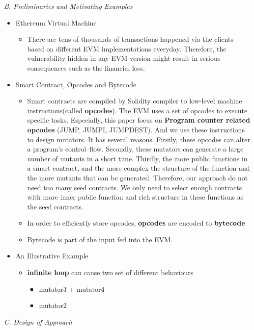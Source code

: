 \documentclass[a4paper]{article}
\begin{document}
	\textit{B. Preliminaries and Motivating Examples}
	\begin{itemize}
		\item Ethereum Virtual Machine
		\begin{itemize}
			\item  There are tens
			of thousands of transactions happened via the clients based on
			different EVM implementations everyday. Therefore, the vulnerability
			hidden in any EVM version might result in serious consequences such as the financial loss.
		\end{itemize}
		\item Smart Contract, Opcodes and Bytecode
		\begin{itemize}
			\item Smart contracts are compiled by Solidity compiler to low-level machine instructions(called \textbf{opcodes}). The EVM uses a set of opcodes to execute specific tasks. Especially, this paper focus on \textbf{Program counter related opcodes} (JUMP, JUMPI, JUMPDEST). And we use these instructions to design mutators. It has several reasons. Firstly, these opcodes can alter a program's control--flow. Secondly, these mutators can generate a large number of mutants in a short time. Thirdly, 
			the more public functions in a smart contract, and the more complex the structure of the function and the more mutants that can be generated. Therefore, our approach do not need too many seed contracts. We only need to select enough contracts with more inner public function and rich structure in these functions as the seed contracts.
			\item In order to efficiently store opcodes, \textbf{opcodes} are encoded to \textbf{bytecode}
			\item Bytecode is part of the input fed into the EVM.
		\end{itemize}
		\item{An Illustrative Example}
		\begin{itemize}
			\item \textbf{infinite loop} can cause two set of different behaviours
			\begin{itemize}
				\item mutator3 + mutator4
				\item mutator2
			\end{itemize}
		\end{itemize}
	\end{itemize}
	\textit{C. Design of Approach}
\end{document}
